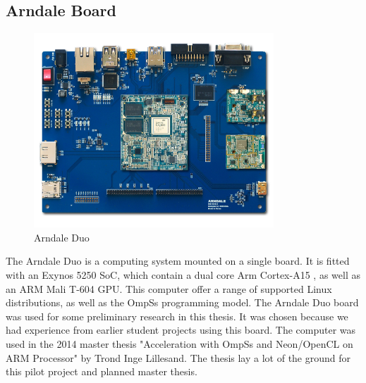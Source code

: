 \subsection{Arndale Board} \label{ArndaleBoard}
\begin{figure}[ht!]
  \centering
  \includegraphics[width=90mm]{fig/Arendale.jpg}
  \caption{Arndale Duo \label{overflow}}
\end{figure}
The Arndale Duo is a computing system mounted on a single board.
It is fitted with an Exynos 5250 SoC, which contain a dual core Arm Cortex-A15 , as well as an ARM Mali T-604 GPU.
This computer offer a range of supported Linux distributions, as well as the OmpSs programming model.
The Arndale Duo board was used for some preliminary research in this thesis.
It was chosen because we had experience from earlier student projects using this board.
The computer was used in the 2014 master thesis "Acceleration with OmpSs and Neon/OpenCL on ARM Processor" by Trond Inge Lillesand.
The thesis lay a lot of the ground for this pilot project and planned master thesis.

